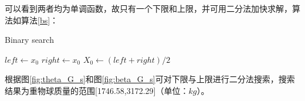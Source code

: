 \documentclass{cumcm}
\begin{document}
可以看到两者均为单调函数，故只有一个下限和上限，并可用二分法加快求解，算法如算法\ref{bs}：\par
\renewcommand{\algorithmicrequire}{\textbf{Input:}} 
\renewcommand{\algorithmicensure}{\textbf{Output:}}
\begin{algorithm} [H] 
	\caption{Binary search} %
	\label{bs} %
	\begin{algorithmic}[1] %
		\STATE $left\leftarrow x_0$
		\ELSE
		\STATE $right\leftarrow x_0$
		\ENDIF
		\STATE $X_0\leftarrow(left+right)/2$
		\ENDWHILE
	\end{algorithmic} 
\end{algorithm}
根据图\ref{fig:theta_G_s}和图\ref{fig:beta_G_s}可对下限与上限进行二分法搜索，搜索结果为重物球质量的范围[1746.58,3172.29]（单位：$kg$）。
\end{document}
